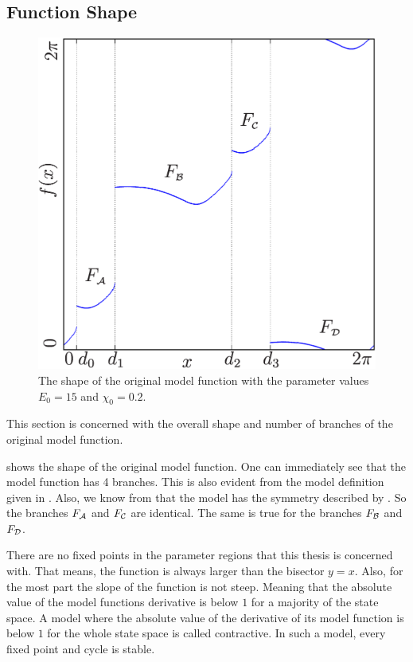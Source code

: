 \subsection{Function Shape}

\begin{figure}
	\centering
	\includegraphics[width=.5 \textwidth]{../Figures/5/5.1/illustration.png}
	\caption[The shape of the original model function]{
		The shape of the original model function with the parameter values $E_0 = 15$ and $\chi_0 = 0.2$.
	}
	\label{fig:setup.char.shape}
\end{figure}

This section is concerned with the overall shape and number of branches of the original model function.

 shows the shape of the original model function.
One can immediately see that the model function has 4 branches.
This is also evident from the model definition given in .
Also, we know from  that the model has the symmetry described by .
So the branches $F_{\mathcal{A}}$ and $F_{\mathcal{C}}$ are identical.
The same is true for the branches $F_{\mathcal{B}}$ and $F_{\mathcal{D}}$.

There are no fixed points in the parameter regions that this thesis is concerned with.
That means, the function is always larger than the bisector $y=x$.
Also, for the most part the slope of the function is not steep.
Meaning that the absolute value of the model functions derivative is below $1$ for a majority of the state space.
A model where the absolute value of the derivative of its model function is below $1$ for the whole state space is called contractive.
In such a model, every fixed point and cycle is stable.
